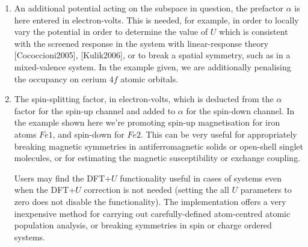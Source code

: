 \documentclass[letterpaper,10pt,english]{sphinxmanual}
\begin{document}
\begin{enumerate}
\item {} 
An additional potential acting on the subspace in question, the
prefactor \(\alpha\) is here entered in electron-volts. This is
needed, for example, in order to locally vary the potential in order
to determine the value of \(U\) which is consistent with the
screened response in the system with linear-response
theory {[}Cococcioni2005{]}, {[}Kulik2006{]}, or to break a
spatial symmetry, such as in a mixed-valence system. In the example
given, we are additionally penalising the occupancy on cerium
\(4f\) atomic orbitals.

\item {} 
The spin-splitting factor, in electron-volts, which is deducted from
the \(\alpha\) factor for the spin-up channel and added to
\(\alpha\) for the spin-down channel. In the example shown here
we’re promoting spin-up magnetisation for iron atoms \(Fe1\), and
spin-down for \(Fe2\). This can be very useful for appropriately
breaking magnetic symmetries in antiferromagnetic solids or
open-shell singlet molecules, or for estimating the magnetic
susceptibility or exchange coupling.

 Users may find the DFT+\(U\) functionality useful in
cases of systems even when the DFT+\(U\) correction is not
needed (setting the all \(U\) parameters to zero does not disable
the functionality). The implementation offers a very inexpensive
method for carrying out carefully-defined atom-centred atomic
population analysis, or breaking symmetries in spin or charge ordered
systems.

\end{enumerate}
\end{document}
